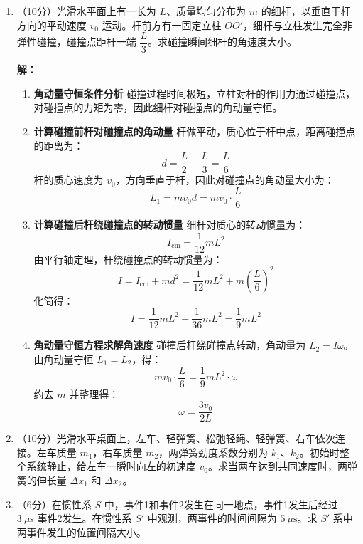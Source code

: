 \documentclass[11pt,a4paper]{article}
\begin{document}
\begin{enumerate}
    \item（10分）光滑水平面上有一长为 \( L \)、质量均匀分布为 \( m \) 的细杆，以垂直于杆方向的平动速度 \( v_0 \) 运动。杆前方有一固定立柱 \( OO' \)，细杆与立柱发生完全非弹性碰撞，碰撞点距杆一端 \( \dfrac{L}{3} \)。求碰撞瞬间细杆的角速度大小。
\vspace{0.5em}

\textbf{解：}
\begin{enumerate}
    \item \textbf{角动量守恒条件分析}
    碰撞过程时间极短，立柱对杆的作用力通过碰撞点，对碰撞点的力矩为零，因此细杆对碰撞点的角动量守恒。

    \item \textbf{计算碰撞前杆对碰撞点的角动量}
    杆做平动，质心位于杆中点，距离碰撞点的距离为：
    \[
    d = \frac{L}{2} - \frac{L}{3} = \frac{L}{6}
    \]
    杆的质心速度为 \( v_0 \)，方向垂直于杆，因此对碰撞点的角动量大小为：
    \[
    L_1 = m v_0 d = m v_0 \cdot \frac{L}{6}
    \]

    \item \textbf{计算碰撞后杆绕碰撞点的转动惯量}
    细杆对质心的转动惯量为：
    \[
    I_{\text{cm}} = \frac{1}{12} m L^2
    \]
    由平行轴定理，杆绕碰撞点的转动惯量为：
    \[
    I = I_{\text{cm}} + m d^2 = \frac{1}{12} m L^2 + m \left( \frac{L}{6} \right)^2
    \]
    化简得：
    \[
    I = \frac{1}{12} m L^2 + \frac{1}{36} m L^2 = \frac{1}{9} m L^2
    \]

    \item \textbf{角动量守恒方程求解角速度}
    碰撞后杆绕碰撞点转动，角动量为 \( L_2 = I \omega \)。
    由角动量守恒 \( L_1 = L_2 \)，得：
    \[
    m v_0 \cdot \frac{L}{6} = \frac{1}{9} m L^2 \cdot \omega
    \]
    约去 \( m \) 并整理得：
    \[
    \omega = \frac{3 v_0}{2 L}
    \]
\end{enumerate}
    \item（10分）光滑水平桌面上，左车、轻弹簧、松弛轻绳、轻弹簧、右车依次连接。左车质量 \( m_1 \)，右车质量 \( m_2 \)，两弹簧劲度系数分别为 \( k_1 \)、\( k_2 \)。初始时整个系统静止，给左车一瞬时向左的初速度 \( v_0 \)。求当两车达到共同速度时，两弹簧的伸长量 \( \Delta x_1 \) 和 \( \Delta x_2 \)。

    \item（6分）在惯性系 \( S \) 中，事件1和事件2发生在同一地点，事件1发生后经过 \( 3\ \mu\mathrm{s} \) 事件2发生。在惯性系 \( S' \) 中观测，两事件的时间间隔为 \( 5\ \mu\mathrm{s} \)。求 \( S' \) 系中两事件发生的位置间隔大小。
\end{enumerate}
\end{document}
